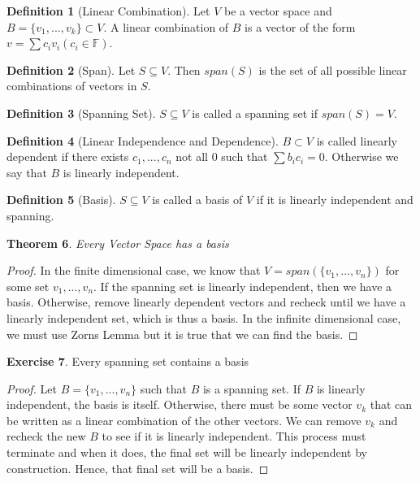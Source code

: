 \documentclass{tufte-handout}
\newtheorem{thm}{Theorem}
\theoremstyle{definition}
\newtheorem{defn}[thm]{Definition}
\newtheorem{exer}[thm]{Exercise}
\theoremstyle{remark}
\newcommand{\F}{\mathbb{F}}
\begin{document}
\begin{defn}[Linear Combination]
Let $V$ be a vector space and $B = \{v_1, ..., v_k\} \subset V$. A linear combination of $B$ is a vector of the form $v = \sum c_iv_i (c_i \in \F) $. 
\end{defn}

\begin{defn}[Span]
Let $S\subseteq V$. Then $span(S)$ is the set of all possible linear combinations of vectors in $S$.
\end{defn}

\begin{defn}[Spanning Set]
$S \subseteq V$ is called a spanning set if $span(S) = V$. 
\end{defn}

\begin{defn}[Linear Independence and Dependence]
$B\subset V$ is called linearly dependent if there exists $c_1, ..., c_n$ not all $0$ such that $\sum b_i c_i = 0$. Otherwise we say that $B$ is linearly independent.
\end{defn}

\begin{defn}[Basis]
$S \subseteq V$ is called a basis of $V$ if it is linearly independent and spanning.
\end{defn}

\begin{thm}Every Vector Space has a basis \end{thm}
\begin{proof}
In the finite dimensional case, we know that $V = span(\{v_1, ..., v_n\})$ for some set $v_1,..., v_n$. If the spanning set is linearly independent, then we have a basis. Otherwise, remove linearly dependent vectors and recheck until we have a linearly independent set, which is thus a basis. In the infinite dimensional case, we must use Zorns Lemma but it is true that we can find the basis.
\end{proof}

\begin{exer}Every spanning set contains a basis\end{exer}
\begin{proof}
Let $B = \{v_1, ..., v_n\}$ such that $B$ is a spanning set. If $B$ is linearly independent, the basis is itself. Otherwise, there must be some vector $v_k$ that can be written as a linear combination of the other vectors. We can remove $v_k$ and recheck the new $B$ to see if it is linearly independent. This process must terminate and when it does, the final set will be linearly independent by construction. Hence, that final set will be a basis.
\end{proof}
\end{document}
